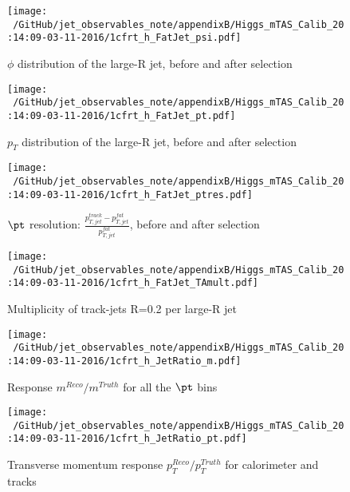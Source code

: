 \begin{figure}
 
\texttt{[image: ~/GitHub/jet\_observables\_note/appendixB/Higgs\_mTAS\_Calib\_20:14:09-03-11-2016/1cfrt\_h\_FatJet\_psi.pdf]}
\caption{$\phi$ distribution of the large-R jet, before and after selection}
 
\end{figure}
 
\begin{figure}
 
\texttt{[image: ~/GitHub/jet\_observables\_note/appendixB/Higgs\_mTAS\_Calib\_20:14:09-03-11-2016/1cfrt\_h\_FatJet\_pt.pdf]}
\caption{$p_{T}$ distribution of the large-R jet, before and after selection}
 
\end{figure}
 
\begin{figure}
 
\texttt{[image: ~/GitHub/jet\_observables\_note/appendixB/Higgs\_mTAS\_Calib\_20:14:09-03-11-2016/1cfrt\_h\_FatJet\_ptres.pdf]}
\caption{$\pt$ resolution: $\frac{p_{T,jet}^{track}-p_{T,jet}^{fat}}{p_{T,jet}^{fat}}$, before and after selection }
 
\end{figure}
 
\begin{figure}
 
\texttt{[image: ~/GitHub/jet\_observables\_note/appendixB/Higgs\_mTAS\_Calib\_20:14:09-03-11-2016/1cfrt\_h\_FatJet\_TAmult.pdf]}
\caption{Multiplicity of track-jets R=0.2 per large-R jet}
 
\end{figure}
\begin{figure}
 
\texttt{[image: ~/GitHub/jet\_observables\_note/appendixB/Higgs\_mTAS\_Calib\_20:14:09-03-11-2016/1cfrt\_h\_JetRatio\_m.pdf]}
\caption{Response $m^{Reco} / m^{Truth}$ for all the $\pt$ bins}
 
\end{figure}
 
\begin{figure}
 
\texttt{[image: ~/GitHub/jet\_observables\_note/appendixB/Higgs\_mTAS\_Calib\_20:14:09-03-11-2016/1cfrt\_h\_JetRatio\_pt.pdf]}
\caption{Transverse momentum response $p_{T}^{Reco} / p_{T}^{Truth}$ for calorimeter and tracks}
 
\end{figure}
 
